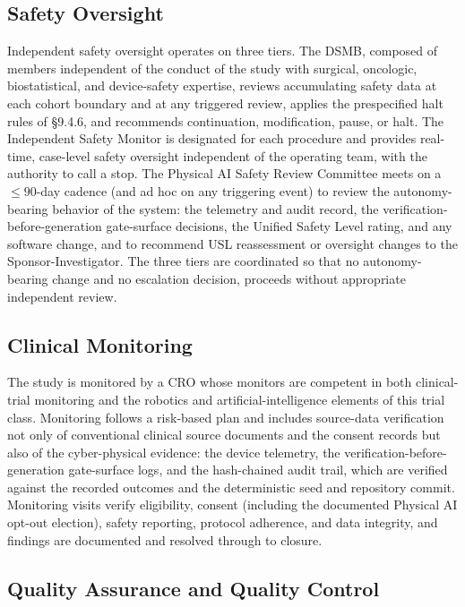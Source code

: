 \subsection{Safety Oversight}

Independent safety oversight operates on three tiers. The DSMB, composed of
members independent of the conduct of the study with surgical, oncologic,
biostatistical, and device-safety expertise, reviews accumulating safety data at
each cohort boundary and at any triggered review, applies the prespecified halt
rules of \S9.4.6, and recommends continuation, modification, pause, or halt. The
Independent Safety Monitor is designated for each procedure and provides
real-time, case-level safety oversight independent of the operating team, with the
authority to call a stop. The Physical AI Safety Review Committee meets on a
$\leq 90$-day cadence (and ad hoc on any triggering event) to review the
autonomy-bearing behavior of the system: the telemetry and audit record, the
verification-before-generation gate-surface decisions, the Unified Safety Level rating, and any software change, and to recommend USL reassessment or
oversight changes to the Sponsor-Investigator. The three tiers are coordinated so
that no autonomy-bearing change and no escalation decision, proceeds without
appropriate independent review.

\subsection{Clinical Monitoring}

The study is monitored by a CRO whose monitors are competent in both clinical-trial
monitoring and the robotics and artificial-intelligence elements of this trial
class. Monitoring follows a risk-based plan and includes source-data verification
not only of conventional clinical source documents and the consent records but
also of the cyber-physical evidence: the device telemetry, the
verification-before-generation gate-surface logs, and the hash-chained audit trail,
which are verified against the recorded outcomes and the deterministic seed and
repository commit. Monitoring visits verify eligibility, consent (including the
documented Physical AI opt-out election), safety reporting, protocol adherence,
and data integrity, and findings are documented and resolved through to closure.

\subsection{Quality Assurance and Quality Control}

